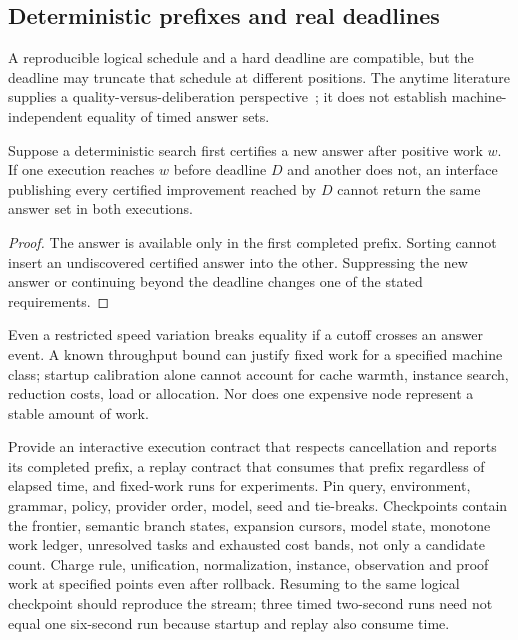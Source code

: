 \subsection{Deterministic prefixes and real deadlines}
\label{sec:search-deadlines}

A reproducible logical schedule and a hard deadline are compatible, but the
deadline may truncate that schedule at different positions. The anytime
literature supplies a quality-versus-deliberation perspective~\cite{anytime};
it does not establish machine-independent equality of timed answer sets.

\begin{proposition}\label{prop:search-deadline}
Suppose a deterministic search first certifies a new answer after positive
work $w$. If one execution reaches $w$ before deadline $D$ and another does
not, an interface publishing every certified improvement reached by $D$
cannot return the same answer set in both executions.
\end{proposition}
\begin{proof}
The answer is available only in the first completed prefix. Sorting cannot
insert an undiscovered certified answer into the other. Suppressing the new
answer or continuing beyond the deadline changes one of the stated requirements.
\end{proof}

Even a restricted speed variation breaks equality if a cutoff crosses an
answer event. A known throughput bound can justify fixed work for a specified
machine class; startup calibration alone cannot account for cache warmth,
instance search, reduction costs, load or allocation. Nor does one expensive
node represent a stable amount of work.

Provide an interactive execution contract that respects cancellation and
reports its completed prefix, a replay contract that consumes that prefix
regardless of elapsed time, and fixed-work runs for experiments. Pin query,
environment, grammar, policy, provider order, model, seed and tie-breaks.
Checkpoints contain the frontier, semantic branch states, expansion cursors,
model state, monotone work ledger, unresolved tasks and exhausted cost bands,
not only a candidate count. Charge rule, unification, normalization, instance,
observation and proof work at specified points even after rollback. Resuming
to the same logical checkpoint should reproduce the stream; three timed
two-second runs need not equal one six-second run because startup and replay
also consume time.

